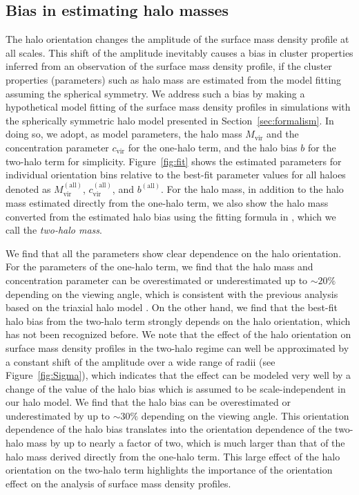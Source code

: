 \documentclass[a4paper,fleqn,usenatbib]{mnras}
\newcommand{\vir}{\mathrm{vir}}
\begin{document}
\subsection{Bias in estimating halo masses}
The halo orientation changes the amplitude of the surface mass density
profile at all scales. This shift of the amplitude inevitably causes
a bias in cluster properties inferred from an observation of
the surface mass density profile,
if the cluster properties (parameters) such as halo mass
are estimated from the model fitting assuming the spherical symmetry.
We address such a bias by making a hypothetical model fitting of
the surface mass density profiles in simulations with the spherically symmetric
halo model presented in Section~\ref{sec:formalism}.
In doing so, we adopt, as model parameters,
the halo mass $M_\vir$ and the concentration parameter $c_\vir$ for the
one-halo term, and the halo bias $b$ for the two-halo term
for simplicity.
Figure~\ref{fig:fit} shows the estimated parameters for individual orientation bins
relative to the best-fit parameter
values for all haloes denoted as $M^\mathrm{(all)}_\vir$,
$c^\mathrm{(all)}_\vir$, and $b^\mathrm{(all)}$. For the halo mass, in
addition to the halo mass estimated directly from the one-halo term,
we also show the halo mass converted from the estimated halo bias using
the fitting formula in \citet{Tinker2010}, which we call the {\it two-halo mass}.

We find that all the parameters show clear dependence on the halo
orientation. For the parameters of the one-halo term, we find that the
halo mass and concentration parameter can be overestimated or
underestimated up to $\sim 20 \%$ depending on the viewing angle, which
is consistent with the previous analysis based on the triaxial halo
model \citep{Oguri2005}. On the other hand, we find
that the best-fit halo bias from the two-halo term strongly depends on the
halo orientation, which has not been recognized before. We note that
the effect of the halo orientation on surface mass density profiles in
the two-halo regime can well be approximated by a constant shift of
the amplitude over a wide range of radii (see Figure~\ref{fig:Sigma}),
which indicates that the effect can be modeled very well by a change
of the value of the halo bias which is assumed to be scale-independent
in our halo model. We find that the halo bias can be overestimated or
underestimated by up to $\sim 30 \%$ depending on the viewing angle.
This orientation dependence of the halo bias translates into the
orientation dependence of the two-halo mass by up to nearly a factor of
two, which is much larger than that of the halo mass derived directly
from the one-halo term. This large effect of the halo orientation on
the two-halo term highlights the importance of the orientation effect
on the analysis of surface mass density profiles.
\end{document}
